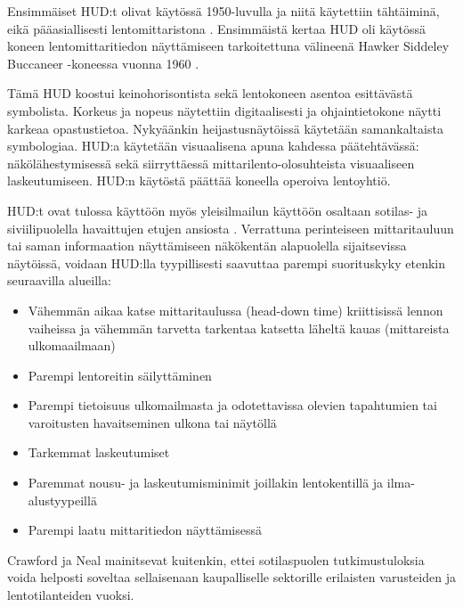 \documentclass[utf8,bachelor,manualbib]{gradu3}
\begin{document}
Ensimmäiset HUD:t olivat käytössä 1950-luvulla ja niitä käytettiin tähtäiminä, eikä pääasiallisesti lentomittaristona \citep{crawfordneal2006}. Ensimmäistä kertaa HUD oli käytössä koneen lentomittaritiedon näyttämiseen tarkoitettuna välineenä Hawker Siddeley Buccaneer -koneessa vuonna 1960 \citep{weintraubensing1992}.

Tämä HUD koostui keinohorisontista sekä lentokoneen asentoa esittävästä symbolista. Korkeus ja nopeus näytettiin digitaalisesti ja ohjaintietokone näytti karkeaa opastustietoa. Nykyäänkin heijastusnäytöissä käytetään samankaltaista symbologiaa. HUD:a käytetään visuaalisena apuna kahdessa päätehtävässä: näkölähestymisessä sekä siirryttäessä mittarilento-olosuhteista visuaaliseen laskeutumiseen. HUD:n käytöstä päättää koneella operoiva lentoyhtiö. \citep{crawfordneal2006}

HUD:t ovat tulossa käyttöön myös yleisilmailun käyttöön osaltaan sotilas- ja siviilipuolella havaittujen etujen ansiosta \citep{ververswickens1998}.  Verrattuna perinteiseen mittaritauluun tai saman informaation näyttämiseen näkökentän alapuolella sijaitsevissa näytöissä, voidaan HUD:lla tyypillisesti saavuttaa parempi suorituskyky etenkin seuraavilla alueilla:

\begin{itemize}
\item Vähemmän aikaa katse mittaritaulussa (head-down time) kriittisissä lennon vaiheissa ja vähemmän tarvetta tarkentaa katsetta läheltä kauas (mittareista ulkomaailmaan) \citep{maywickens1995}
\item Parempi lentoreitin säilyttäminen \citep{fischerym1980, lauberym1982, wickenslong1995}
\item Parempi tietoisuus ulkomailmasta ja odotettavissa olevien tapahtumien tai varoitusten havaitseminen ulkona tai näytöllä \citep{fischer1979, larishwickens1991, maywickens1995, wickenslong1995}
\item Tarkemmat laskeutumiset \citep{naish1964}
\item Paremmat nousu- ja laskeutumisminimit joillakin lentokentillä ja ilma-alustyypeillä \citep{crawfordneal2006}
\item Parempi laatu mittaritiedon näyttämisessä \citep{maywickens1995}
\end{itemize}

Crawford ja Neal \citeyearpar{crawfordneal2006} mainitsevat kuitenkin, ettei sotilaspuolen tutkimustuloksia voida helposti soveltaa sellaisenaan kaupalliselle sektorille erilaisten varusteiden ja lentotilanteiden vuoksi.
\end{document}
